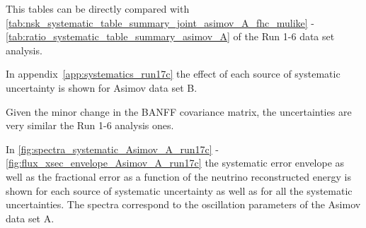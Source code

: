 This tables can be directly compared with \cref{tab:nsk_systematic_table_summary_joint_asimov_A_fhc_mulike} -
\ref{tab:ratio_systematic_table_summary_asimov_A} of the Run 1-6 data set analysis.

In appendix~\cref{app:systematics_run17c} the effect of each source of systematic uncertainty 
is shown for Asimov data set B.

Given the minor change in the BANFF covariance matrix, the uncertainties are very similar
the Run 1-6 analysis ones.




\clearpage



In \cref{fig:spectra_systematic_Asimov_A_run17c} - \ref{fig:flux_xsec_envelope_Asimov_A_run17c}
the systematic error envelope as well as the fractional error as a function of the
neutrino reconstructed energy is shown for each source of systematic uncertainty
as well as for all the systematic uncertainties. 
The spectra correspond to the oscillation parameters of the Asimov data set A.

